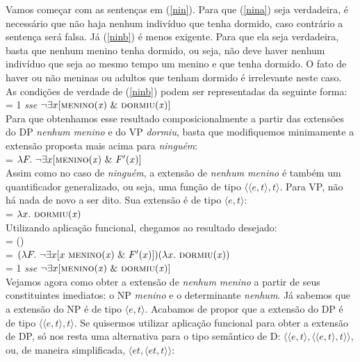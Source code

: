 Vamos começar com as sentenças em (\ref{nin}). Para que
(\ref{nina}) seja verdadeira, é necessário que não haja nenhum
indivíduo que tenha dormido, caso contrário a sentença será falsa. Já
(\ref{ninb}) é menos exigente. Para que ela seja verdadeira, basta
que nenhum menino tenha dormido, ou seja, não deve haver nenhum
indivíduo que seja ao mesmo tempo um menino e que tenha dormido. O
fato de haver ou não meninas ou adultos que tenham dormido é
irrelevante neste caso. As condições de verdade de (\ref{ninb})
podem ser representadas da seguinte forma:\\

\n \den{(\ref{ninb})} = 1 \textit{sse} $\neg\exists x [\text{\textsc{menino}(\textit{x})}\ \&\ \text{\textsc{dormiu}(\textit{x})}]$\\

\n Para que obtenhamos esse resultado composicionalmente a partir
das extensões do DP \textit{nenhum menino} e do VP \textit{dormiu}, basta que
modifiquemos minimamente a extensão proposta mais acima para
\textit{ninguém}:\\

\n {} = $\lambda F.\ \neg\exists x [\text{\textsc{menino}(\textit{x})}\ \& \ F'(x)]$\\

Assim como no caso de \textit{ninguém}, a extensão de \textit{nenhum menino} é
também um quantificador generalizado, ou seja, uma função de tipo
$\langle\langle e,t\rangle,t\rangle$. Para VP, não há nada de novo
a ser dito. Sua extensão é de tipo $\langle e,t\rangle$:\\

\n {} = $\lambda x.\ \predica{dormiu}{x}$\\

\n Utilizando aplicação funcional, chegamos ao resultado
desejado:\\

\n {} =
()\\

\n = $(\lambda F.\ \neg\exists x [ x\ \predica{menino}{x}\ \& \ F'(x)])(\lambda x.\ \predica{dormiu}{x})$\\

\n = 1 \textit{sse} $\neg\exists x [ \text{\textsc{menino}(\textit{x})}\ \& \ \text{\textsc{dormiu}(\textit{x})}]$\\

Vejamos agora como obter a extensão de \textit{nenhum menino} a partir de
seus constituintes imediatos: o NP \textit{menino} e o determinante
\textit{nenhum}. Já sabemos que a extensão do NP é de tipo $\langle
e,t\rangle$. Acabamos de propor que a extensão do DP é de tipo
$\langle\langle e,t\rangle,t\rangle$. Se quisermos utilizar
aplicação funcional para obter a extensão de DP, só nos resta uma
alternativa para o tipo semântico de D: $\langle\langle
e,t\rangle,\langle\langle e,t\rangle,t\rangle\rangle$, ou, de
maneira simplificada, $\langle et,\langle
et,t\rangle\rangle$:\\


